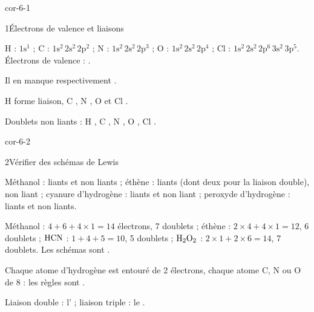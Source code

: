 \corrigesSouples

\begin{blocLivre}{cor-6-1}
\begin{corrige}{1}{Électrons de valence et liaisons}
\begin{questions}
\item H : $1\mathrm{s}^1$ ; C : $1\mathrm{s}^2\,2\mathrm{s}^2\,2\mathrm{p}^2$ ; N : $1\mathrm{s}^2\,2\mathrm{s}^2\,2\mathrm{p}^3$ ; O : $1\mathrm{s}^2\,2\mathrm{s}^2\,2\mathrm{p}^4$ ;
Cl : $1\mathrm{s}^2\,2\mathrm{s}^2\,2\mathrm{p}^6\,3\mathrm{s}^2\,3\mathrm{p}^5$. Électrons de valence : .
\item Il en manque respectivement .
\item H forme  liaison, C , N , O  et Cl .
\item Doublets non liants : H , C , N , O , Cl .
\end{questions}
\end{corrige}
\end{blocLivre}
\begin{blocLivre}{cor-6-2}
\begin{corrige}{2}{Vérifier des schémas de Lewis}
\begin{questions}
\item Méthanol :  liants et  non liants ; éthène :  liants (dont deux pour la liaison double),  non liant ;
cyanure d'hydrogène :  liants et  non liant ; peroxyde d'hydrogène :  liants et  non liants.
\item Méthanol : $4+6+4\times1=14$ électrons, 7 doublets ; éthène : $2\times4+4\times1=12$, 6 doublets ; $\ce{HCN}$ : $1+4+5=10$, 5 doublets ;
$\ce{H2O2}$ : $2\times1+2\times6=14$, 7 doublets. Les schémas sont .
\item Chaque atome d'hydrogène est entouré de 2 électrons, chaque atome C, N ou O de 8 : les règles sont
.
\item Liaison double : l' ; liaison triple : le .
\end{questions}
\end{corrige}
\end{blocLivre}
